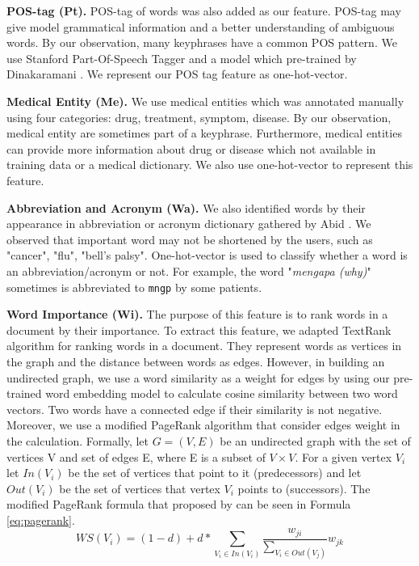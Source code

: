 \documentclass[sigconf]{acmart}
\begin{document}
\textbf{POS-tag (Pt).} POS-tag of words was also added as our feature. POS-tag may give model grammatical information and a better understanding of ambiguous words. By our observation, many keyphrases have a common POS pattern. We use Stanford Part-Of-Speech Tagger and a model which pre-trained by Dinakaramani \cite{dinakaramani2014designing}. We represent our POS tag feature as one-hot-vector.

\textbf{Medical Entity (Me).} We use medical entities which was annotated manually using four categories: drug, treatment, symptom, disease. By our observation, medical entity are sometimes part of a keyphrase. Furthermore, medical entities can provide more information about drug or disease which not available in training data or a medical dictionary. We also use one-hot-vector to represent this feature.

\textbf{Abbreviation and Acronym (Wa).} We also identified words by their appearance in abbreviation or acronym dictionary gathered by Abid \cite{skripsiKakAbid}. We observed that important word may not be shortened by the users, such as "cancer", "flu", "bell's palsy". One-hot-vector is used to classify whether a word is an abbreviation/acronym or not. For example, the word "\textit{mengapa (why)}" sometimes is abbreviated to \texttt{mngp} by some patients.

\textbf{Word Importance (Wi).} The purpose of this feature is to rank words in a document by their importance. To extract this feature, we adapted  TextRank \cite{mihalcea2004textrank} algorithm for ranking words in a document. They represent words as vertices in the graph and the distance between words as edges. However, in building an undirected graph, we use a word similarity as a weight for edges by using our pre-trained word embedding model to calculate cosine similarity between two word vectors. Two words have a connected edge if their similarity is not negative. Moreover, we use a modified PageRank \cite{page1999pagerank} algorithm that consider edges weight in the calculation. Formally, let $G = (V, E)$ be an undirected graph with the set of vertices V and set of edges E, where E is a subset of $V \times V$. For a given vertex $V_i$ let $In(V_i)$ be the set of vertices that point to it (predecessors) and let $Out(V_i)$ be the set of vertices that vertex $V_i$ points to (successors). The modified PageRank formula that proposed by \cite{mihalcea2004textrank} can be seen in Formula \ref{eq:pagerank}.
\begin{equation}\label{eq:pagerank}
WS(V_{i})=(1-d) + d * \sum_{V_{i} \in In(V_{i})} \frac{w_{ji}}{\sum_{V_{i} \in Out(V_{j})}}w_{jk}
\end{equation}
\end{document}
